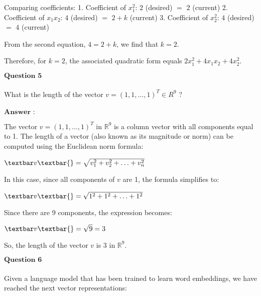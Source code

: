 \documentclass[11pt]{article}
\begin{document}
Comparing coefficients: 1. Coefficient of $x_1^2$: $2$ (desired)
$=$ $2$ (current) 2. Coefficient of $x_1x_2$: $4$ (desired)
$=$ $2 + k$ (current) 3. Coefficient of $x_2^2$: $4$ (desired)
$=$ $4$ (current)

From the second equation, $4 = 2 + k$, we find that $k = 2$.

Therefore, for $k = 2$, the associated quadratic form equals
$2x_1^2 + 4x_1x_2 + 4x_2^2$.

    $\textbf{Question 5}$\\
~\\
What is the length of the vector $v=(1,1,…,1)^T∈R^9$ ?\\
~\\
$\textbf{Answer :}$

    The vector $ v = (1, 1, \ldots, 1)^T $ in $ \mathbb{R}^9 $ is
a column vector with all components equal to 1. The length of a vector
(also known as its magnitude or norm) can be computed using the
Euclidean norm formula:

$ \textbar v\textbar{} = \sqrt{v_1^2 + v_2^2 + \ldots + v_n^2} $

In this case, since all components of $ v $ are 1, the formula
simplifies to:

$ \textbar v\textbar{} = \sqrt{1^2 + 1^2 + \ldots + 1^2} $

Since there are 9 components, the expression becomes:

$ \textbar v\textbar{} = \sqrt{9} = 3 $

So, the length of the vector $ v $ is 3 in $ \mathbb{R}^9 $.

    $\textbf{Question 6}$\\
~\\
Given a language model that has been trained to learn word embeddings,
we have reached the next vector representations:
\end{document}
